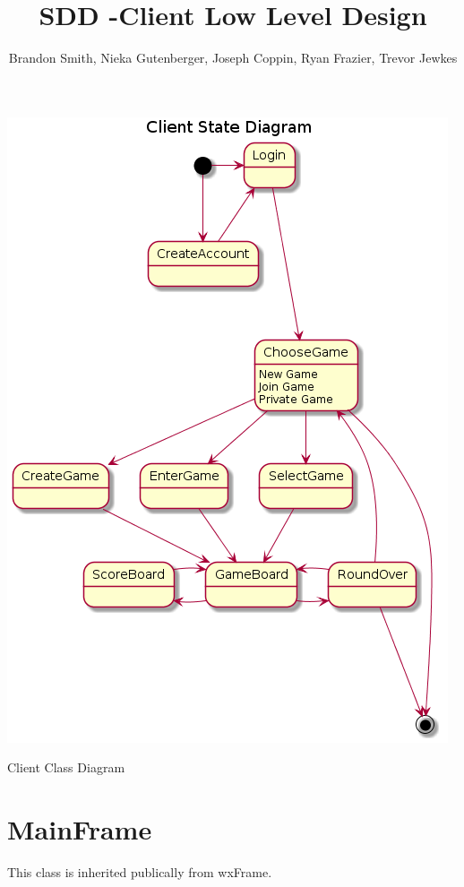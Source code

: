 \documentclass[]{scrartcl}
\title{SDD -Client Low Level Design}
\author{Brandon Smith, Nieka Gutenberger, Joseph Coppin, Ryan Frazier, Trevor Jewkes}
\begin{document}
\maketitle

\centerline{\includegraphics{Client State Diagram.png}}
\centerline{Client Class Diagram}

\section{MainFrame}
	This class is inherited publically from wxFrame.
\end{document}
